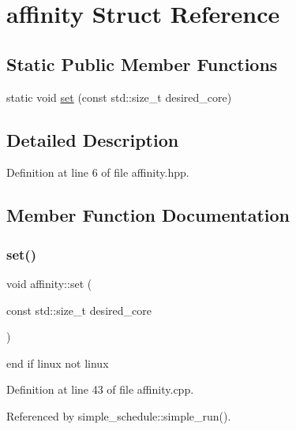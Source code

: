 \hypertarget{structaffinity}{}\section{affinity Struct Reference}
\label{structaffinity}
\subsection*{Static Public Member Functions}
\begin{DoxyCompactItemize}
\item 
static void \hyperlink{structaffinity_abe34f20b4d661e9ed44ca5def0470e00}{set} (const std\+::size\+\_\+t desired\+\_\+core)
\end{DoxyCompactItemize}


\subsection{Detailed Description}


Definition at line 6 of file affinity.\+hpp.



\subsection{Member Function Documentation}
\hypertarget{structaffinity_abe34f20b4d661e9ed44ca5def0470e00}{}\label{structaffinity_abe34f20b4d661e9ed44ca5def0470e00} 
\subsubsection{\texorpdfstring{set()}{set()}}
{\footnotesize\ttfamily void affinity\+::set (\begin{DoxyParamCaption}\item[{const std\+::size\+\_\+t}]{desired\+\_\+core }\end{DoxyParamCaption})\hspace{0.3cm}{\ttfamily [static]}}

end if linux not linux 

Definition at line 43 of file affinity.\+cpp.



Referenced by simple\+\_\+schedule\+::simple\+\_\+run().


